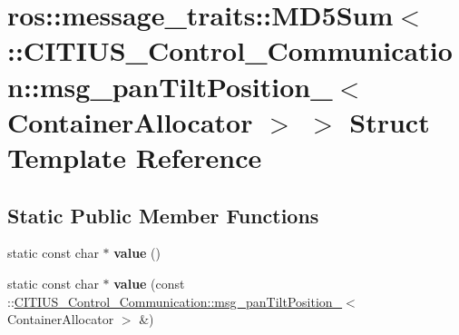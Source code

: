 \hypertarget{structros_1_1message__traits_1_1_m_d5_sum_3_01_1_1_c_i_t_i_u_s___control___communication_1_1msg_931f14414178b5de77b11204b4610e37}{\section{ros\-:\-:message\-\_\-traits\-:\-:\-M\-D5\-Sum$<$ \-:\-:\-C\-I\-T\-I\-U\-S\-\_\-\-Control\-\_\-\-Communication\-:\-:msg\-\_\-pan\-Tilt\-Position\-\_\-$<$ \-Container\-Allocator $>$ $>$ \-Struct \-Template \-Reference}
\label{structros_1_1message__traits_1_1_m_d5_sum_3_01_1_1_c_i_t_i_u_s___control___communication_1_1msg_931f14414178b5de77b11204b4610e37}
}
\subsection*{\-Static \-Public \-Member \-Functions}
\begin{DoxyCompactItemize}
\item 
\hypertarget{structros_1_1message__traits_1_1_m_d5_sum_3_01_1_1_c_i_t_i_u_s___control___communication_1_1msg_931f14414178b5de77b11204b4610e37_abcce6ea34801e44dc8990da071e4f439}{static const char $\ast$ {\bfseries value} ()}\label{structros_1_1message__traits_1_1_m_d5_sum_3_01_1_1_c_i_t_i_u_s___control___communication_1_1msg_931f14414178b5de77b11204b4610e37_abcce6ea34801e44dc8990da071e4f439}

\item 
\hypertarget{structros_1_1message__traits_1_1_m_d5_sum_3_01_1_1_c_i_t_i_u_s___control___communication_1_1msg_931f14414178b5de77b11204b4610e37_a0536acd24108f49f6ee6a45e78f608f0}{static const char $\ast$ {\bfseries value} (const \-::\hyperlink{struct_c_i_t_i_u_s___control___communication_1_1msg__pan_tilt_position__}{\-C\-I\-T\-I\-U\-S\-\_\-\-Control\-\_\-\-Communication\-::msg\-\_\-pan\-Tilt\-Position\-\_\-}$<$ \-Container\-Allocator $>$ \&)}\label{structros_1_1message__traits_1_1_m_d5_sum_3_01_1_1_c_i_t_i_u_s___control___communication_1_1msg_931f14414178b5de77b11204b4610e37_a0536acd24108f49f6ee6a45e78f608f0}

\end{DoxyCompactItemize}
